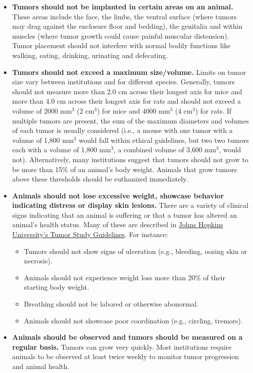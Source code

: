 \documentclass[letterpaper, 12pt]{article}
\begin{document}
\begin{itemize}
    \setlength\itemsep{-0.5em}
    \item \textbf{Tumors should not be implanted in certain areas on an animal.} These areas include the face, the limbs, the ventral surface (where tumors may drag against the enclosure floor and bedding), the genitalia and within muscles (where tumor growth could cause painful muscular distension). Tumor placement should not interfere with normal bodily functions like walking, eating, drinking, urinating and defecating.
    \item \textbf{Tumors should not exceed a maximum size/volume.} Limits on tumor size vary between institutions and for different species. Generally, tumors should not measure more than 2.0 cm across their longest axis for mice and more than 4.0 cm across their longest axis for rats and should not exceed a volume of 2000 mm$^3$ (2 cm$^3$) for mice and 4000 mm$^3$ (4 cm$^3$) for rats. If multiple tumors are present, the sum of the maximum diameters and volumes of each tumor is usually considered (i.e., a mouse with one tumor with a volume of 1,800 mm$^3$ would fall within ethical guidelines, but two two tumors each with a volume of 1,800 mm$^3$, a combined volume of 3,600 mm$^3$, would not). Alternatively, many institutions suggest that tumors should not grow to be more than 15\% of an animal's body weight. Animals that grow tumors above these thresholds should be euthanized immediately.
    \item \textbf{Animals should not lose excessive weight, showcase behavior indicating distress or display skin lesions.} There are a variety of clinical signs indicating that an animal is suffering or that a tumor has altered an animal's health status. Many of these are described in \href{https://animalcare.jhu.edu/wp-content/uploads/sites/5/Tumor-Study-Guidelines-in-Mice-and-Rats.pdf}{Johns Hopkins University's Tumor Study Guidelines}. For instance:
    \begin{itemize}
    \setlength\itemsep{-0.5em}
       \item Tumors should not show signs of ulceration (e.g., bleeding, oozing skin or necrosis).
       \item Animals should not experience weight loss more than 20\% of their starting body weight.
       \item Breathing should not be labored or otherwise abonormal.
       \item Animals should not showcase poor coordination (e.g., circling, tremors).
    \end{itemize}
    \item \textbf{Animals should be observed and tumors should be measured on a regular basis.} Tumors can grow very quickly. Most institutions require animals to be observed at least twice weekly to monitor tumor progression and animal health.
\end{itemize}
\end{document}
